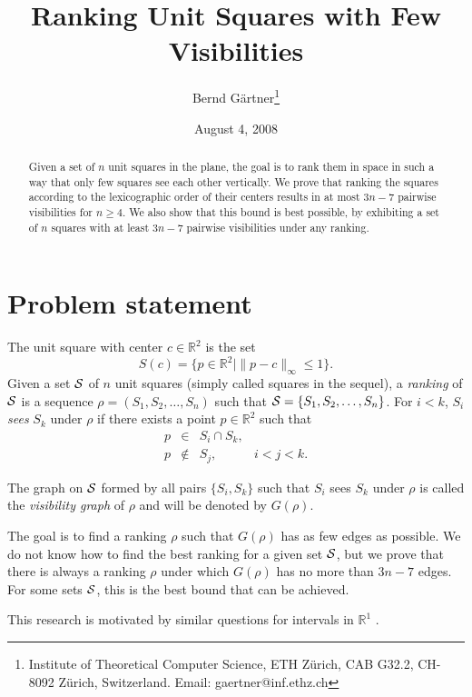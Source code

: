 \documentclass[fleqn,11pt]{article}
\newcommand{\R}{\mathds{R}}
\begin{document}
\title{Ranking Unit Squares with Few Visibilities} 
\author{Bernd G\"artner\thanks{
Institute of Theoretical Computer Science, 
ETH Z{\"u}rich, CAB G32.2, CH-8092 Z{\"u}rich, Switzerland. Email:
gaertner@inf.ethz.ch}}
\date{August 4, 2008} 
\maketitle

\begin{abstract}
  Given a set of $n$ unit squares in the plane, the goal is to rank
  them in space in such a way that only few squares see each other
  vertically.  We prove that ranking the squares according to the
  lexicographic order of their centers results in at most $3n-7$
  pairwise visibilities for $n\geq 4$.  We also show that this bound is
  best possible, by exhibiting a set of $n$ squares with at least
  $3n-7$ pairwise visibilities under any ranking.
\end{abstract}

\section{Problem statement}
The unit square with center $c\in\R^2$ is the set
\[S(c) = \{p\in\R^2\mid \|p-c\|_{\infty}\leq 1\}.\] Given a set ${\cal
  S}$ of $n$ unit squares (simply called squares in the sequel), a
\emph{ranking} of ${\cal S}$ is a sequence
$\rho=(S_1,S_2,\ldots,S_n)$ such that ${\cal
  S}=\{S_1,S_2,\ldots,S_n\}$. For $i<k$, $S_i$ \emph{sees}
$S_k$ under $\rho$ if there exists a point $p\in\R^2$ such that
\[
\begin{array}{rcll}
p&\in& S_i\cap S_k,\\
p&\notin& S_j, & i<j<k.
\end{array}
\]

The graph on ${\cal S}$ formed by all pairs $\{S_i,S_k\}$ such that
$S_i$ sees $S_k$ under $\rho$ is called the \emph{visibility graph}
of $\rho$ and will be denoted by $G(\rho)$. 

The goal is to find a ranking $\rho$ such that $G(\rho)$ has as
few edges as possible. We do not know how to find the best ranking for
a given set ${\cal S}$, but we prove that there is always a ranking 
$\rho$ under which $G(\rho)$ has no more than $3n-7$ edges. For
some sets ${\cal S}$, this is the best bound that can be achieved.

This research is motivated by similar questions for intervals in
$\R^1$ \cite{intervals}.
\end{document}
